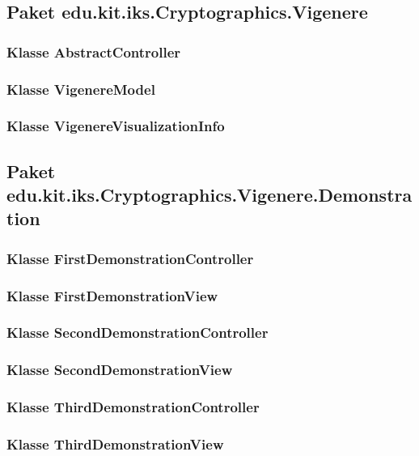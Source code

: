 \documentclass{article}
\begin{document}
  \subsection{Paket edu.kit.iks.Cryptographics.Vigenere}
    \subsubsection{Klasse AbstractController}

    \subsubsection{Klasse VigenereModel}

    \subsubsection{Klasse VigenereVisualizationInfo}

  \subsection{Paket edu.kit.iks.Cryptographics.Vigenere.Demonstration}
    \subsubsection{Klasse FirstDemonstrationController}

    \subsubsection{Klasse FirstDemonstrationView}

    \subsubsection{Klasse SecondDemonstrationController}

    \subsubsection{Klasse SecondDemonstrationView}

    \subsubsection{Klasse ThirdDemonstrationController}

    \subsubsection{Klasse ThirdDemonstrationView}
\end{document}
